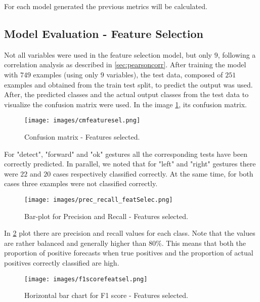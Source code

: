 \noindent For each model generated the previous metrics will be calculated. 

\subsection{Model Evaluation - Feature Selection}
\label{subsec:featselec}
Not all variables were used in the feature selection model, but only $9$, following a correlation analysis as described in \ref{sec:pearsoncorr}. After training the model with $749$ examples (using only $9$ variables), the test data, composed of $251$ examples and obtained from the train test split, to predict the output was used. After, the predicted classes and the actual output classes from the test data to visualize the confusion matrix were used. In the image \ref{fig:confselec}, its confusion matrix.

\begin{figure}[h]
	\centering
	\texttt{[image: images/cmfeaturesel.png]}
	\caption[Confusion matrix - Features selected.]{Confusion matrix - Features selected.}
	\label{fig:confselec}
\end{figure}

\noindent For "detect", "forward" and "ok" gestures all the corresponding tests have been correctly predicted. In parallel, we noted that for "left" and "right" gestures there were $22$ and $20$ cases respectively classified correctly. At the same time, for both cases three examples were not classified correctly. \\

\begin{figure}[h]
	\centering
	\texttt{[image: images/prec\_recall\_featSelec.png]}
	\caption[Bar-plot for Precision and Recall - Features selected.]{Bar-plot for Precision and Recall - Features selected.}
	\label{fig:precrecfeatsel}
\end{figure}

\noindent In \ref{fig:precrecfeatsel} plot there are precision and recall values for each class. Note that the values are rather balanced and generally higher than 80\%. This means that both the proportion of positive forecasts when true positives and the proportion of actual positives correctly classified are high. \\

\begin{figure}[h]
	\centering
	\texttt{[image: images/f1scorefeatsel.png]}
	\caption[Horizontal bar chart for F1 score - Features selected.]{Horizontal bar chart for F1 score - Features selected.}
	\label{fig:f1featsel}
\end{figure}

